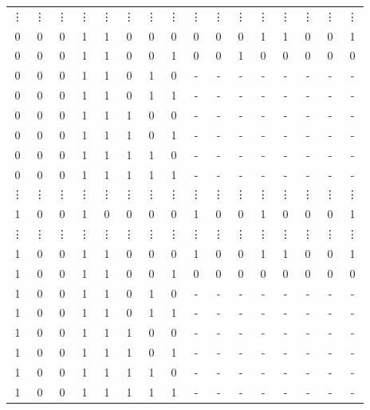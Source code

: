 \documentclass{scrartcl}
\begin{document}
\begin{table}[H]
\begin{tabular}{cccccccc|cccccccc}
    \vdots & \vdots & \vdots & \vdots & \vdots & \vdots & \vdots & \vdots & \vdots & \vdots & \vdots & \vdots & \vdots & \vdots & \vdots & \vdots \\
    0 & 0 & 0 & 1 & 1 & 0 & 0 & 0 & 0 & 0 & 0 & 1 & 1 & 0 & 0 & 1 \\
    0 & 0 & 0 & 1 & 1 & 0 & 0 & 1 & 0 & 0 & 1 & 0 & 0 & 0 & 0 & 0 \\
    0 & 0 & 0 & 1 & 1 & 0 & 1 & 0 & - & - & - & - & - & - & - & - \\
    0 & 0 & 0 & 1 & 1 & 0 & 1 & 1 & - & - & - & - & - & - & - & - \\
    0 & 0 & 0 & 1 & 1 & 1 & 0 & 0 & - & - & - & - & - & - & - & - \\
    0 & 0 & 0 & 1 & 1 & 1 & 0 & 1 & - & - & - & - & - & - & - & - \\
    0 & 0 & 0 & 1 & 1 & 1 & 1 & 0 & - & - & - & - & - & - & - & - \\
    0 & 0 & 0 & 1 & 1 & 1 & 1 & 1 & - & - & - & - & - & - & - & - \\
    \vdots & \vdots & \vdots & \vdots & \vdots & \vdots & \vdots & \vdots & \vdots & \vdots & \vdots & \vdots & \vdots & \vdots & \vdots & \vdots \\
    1 & 0 & 0 & 1 & 0 & 0 & 0 & 0 & 1 & 0 & 0 & 1 & 0 & 0 & 0 & 1 \\
    \vdots & \vdots & \vdots & \vdots & \vdots & \vdots & \vdots & \vdots & \vdots & \vdots & \vdots & \vdots & \vdots & \vdots & \vdots & \vdots \\
    1 & 0 & 0 & 1 & 1 & 0 & 0 & 0 & 1 & 0 & 0 & 1 & 1 & 0 & 0 & 1 \\
    1 & 0 & 0 & 1 & 1 & 0 & 0 & 1 & 0 & 0 & 0 & 0 & 0 & 0 & 0 & 0 \\
    1 & 0 & 0 & 1 & 1 & 0 & 1 & 0 & - & - & - & - & - & - & - & - \\
    1 & 0 & 0 & 1 & 1 & 0 & 1 & 1 & - & - & - & - & - & - & - & - \\
    1 & 0 & 0 & 1 & 1 & 1 & 0 & 0 & - & - & - & - & - & - & - & - \\
    1 & 0 & 0 & 1 & 1 & 1 & 0 & 1 & - & - & - & - & - & - & - & - \\
    1 & 0 & 0 & 1 & 1 & 1 & 1 & 0 & - & - & - & - & - & - & - & - \\
    1 & 0 & 0 & 1 & 1 & 1 & 1 & 1 & - & - & - & - & - & - & - & - \\
    \hline
  \end{tabular}
\end{table}
\end{document}

